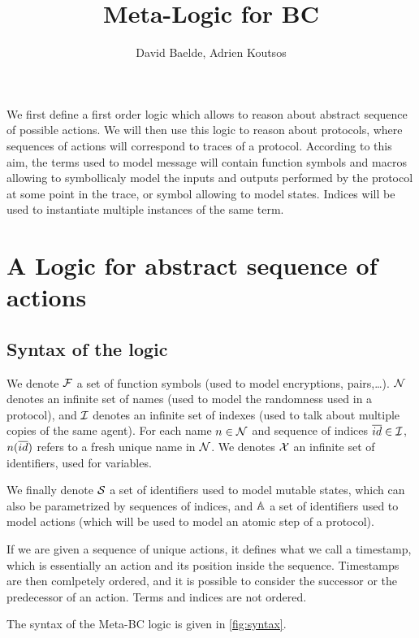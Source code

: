 \documentclass[a4paper]{article}
\theoremstyle{remark}
\begin{document}
\title{Meta-Logic for BC}


\author{David Baelde, Adrien Koutsos}

\maketitle


We first define a first order logic which allows to reason about abstract sequence of possible actions. We will then use this logic to reason about protocols, where sequences of actions will correspond to traces of a protocol. According to this aim, the terms used to model message will contain function symbols and macros allowing to symbollicaly model the inputs and outputs performed by the protocol at some point in the trace, or symbol allowing to model states. Indices will be used to instantiate multiple instances of the same term.
\section{A Logic for abstract sequence of actions}

\subsection{Syntax of the logic}
We denote $\mathcal{F}$ a set of function symbols (used to model encryptions,
pairs,\dots). $\mathcal{N}$ denotes an
infinite set of names (used to model the randomness used in a
protocol), and $\mathcal{I}$ denotes an infinite set of indexes (used to talk
about multiple copies of the same agent). For
each name $n\in \mathcal{N}$ and sequence of indices $\overline{id} \in \mathcal{I}$,
$n(\overline{id})$ refers to a fresh unique name in $\mathcal{N}$. We denotes $\mathcal{X}$ an
infinite set of identifiers, used for variables.

We finally denote $\mathcal{S}$ a set of identifiers used to model
mutable
states, which can also be parametrized by sequences of indices, and
$\mathbb{A}$ a set of identifiers used to model actions
(which
will be used
to model an atomic step of a protocol).

If we are given a sequence of unique actions, it defines what we call a timestamp, which is essentially an action and its position inside the sequence. Timestamps are then comlpetely ordered, and it is possible to consider the successor or the predecessor of an action. Terms and indices are not ordered.

The syntax of the Meta-BC logic is given in \cref{fig:syntax}.
\end{document}
